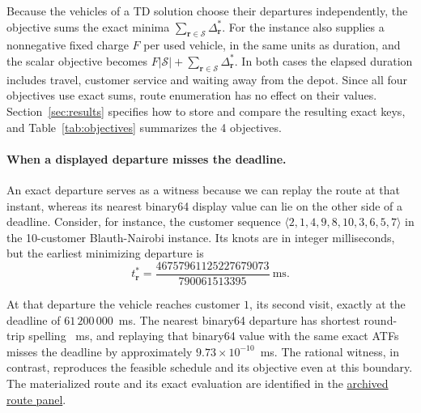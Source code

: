 Because the vehicles of a TD solution choose their departures independently, the objective  sums the exact minima $\sum_{\mathbf r\in\mathcal S}\Delta_{\mathbf r}^*$. For  the instance also supplies a nonnegative fixed charge $F$ per used vehicle, in the same units as duration, and the scalar objective becomes $F|\mathcal S|+\sum_{\mathbf r\in\mathcal S}\Delta_{\mathbf r}^*$. In both cases the elapsed duration includes travel, customer service and waiting away from the depot. Since all four objectives use exact sums, route enumeration has no effect on their values. Section~\ref{sec:results} specifies how to store and compare the resulting exact keys, and Table~\ref{tab:objectives} summarizes the 4 objectives.

\paragraph{When a displayed departure misses the deadline.}

An exact departure serves as a witness because we can replay the route at that instant, whereas its nearest binary64 display value can lie on the other side of a deadline. Consider, for instance, the customer sequence $\langle 2,1,4,9,8,10,3,6,5,7\rangle$ in the 10-customer Blauth-Nairobi instance. Its knots are in integer milliseconds, but the earliest minimizing departure is
\[
 t_{\mathbf r}^*=\frac{46757961125227679073}{790061513395}\ \mathrm{ms}.
\]

At that departure the vehicle reaches customer $1$, its second visit, exactly at the deadline of $61\,200\,000$~ms. The nearest binary64 departure has shortest round-trip spelling ~ms, and replaying that binary64 value with the same exact ATFs misses the deadline by approximately $9.73\times10^{-10}$~ms. The rational witness, in contrast, reproduces the feasible schedule and its objective even at this boundary. The materialized route and its exact evaluation are identified in the \href{https://github.com/0nyr/routing-numerical-contracts/blob/75905c8827f959621ea808894e28136d248d2d15/results/rational-panel.json}{archived route panel}.
